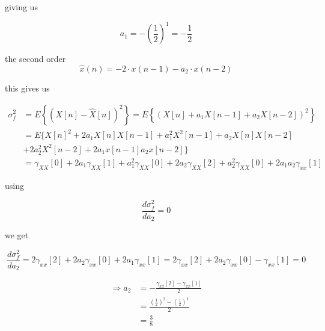 giving us

$$a_1=-\left(\frac{1}{2}\right)^{1}=-\frac{1}{2}$$


the second order 
$$\hat{x}(n)=-2\cdot x(n-1)-a_2\cdot x(n-2)$$

this gives us

$$
\begin{aligned}
\sigma_f^2 & =E\left\{(X[n]-\hat{X}[n])^2\right\}=E\left\{\left(X[n]+a_1 X[n-1]+a_2 X[n-2]\right)^2\right\} \\
& = E \{X[n]^2+2a_1 X[n]X[n-1]+a_1^2X^2[n-1]+a_2 X[n]X[n-2]\\
& +2a_2^2X^2[n-2]+2a_1x[n-1]a_2x[n-2] \}\\
& =\gamma_{X X}[0]+2 a_1 \gamma_{X X}[1]+a_1^2 \gamma_{X X}[0]+2 a_2 \gamma_{X X}[2]+a_2^2 \gamma_{X X}[0] + 2a_1a_2\gamma_{xx}[1]
\end{aligned}
$$

using 

$$\frac{d\sigma_f^2}{da_2}=0$$

we get

$$\frac{d\sigma_f^2}{da_2}=2\gamma_{xx}[2]+2a_2\gamma_{xx}[0]+2a_1\gamma_{xx}[1]=2\gamma_{xx}[2]+2a_2\gamma_{xx}[0]-\gamma_{xx}[1]=0$$

$$
\begin{aligned}
    \Rightarrow a_2&=-\frac{\gamma_{xx}[2]-\gamma_{xx}[1]}{2}\\
    &= \frac{\left(\frac{1}{2}\right)^{2}-\left(\frac{1}{2}\right)^{1}}{2}\\
    &= \frac{3}{8}
\end{aligned}
$$

